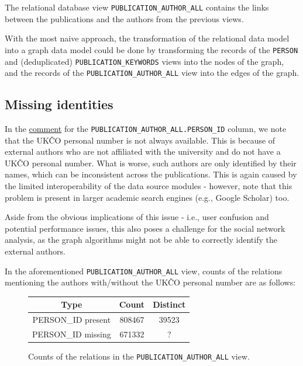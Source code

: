 The relational database view \texttt{PUBLICATION\_AUTHOR\_ALL} contains the links between the publications and the authors from the previous views.

With the most naive approach, the transformation of the relational data model into a graph data model could be done by transforming the records of the 
\texttt{PERSON} and (deduplicated) \texttt{PUBLICATION\_KEYWORDS} views into the nodes of the graph, 
and the records of the \texttt{PUBLICATION\_AUTHOR\_ALL} view into the edges of the graph.

\subsection{Missing identities}\label{sec:inferring-missing-identities}

    In the \hyperref[sec:pub-author-all]{comment} for the \texttt{PUBLICATION\_AUTHOR\_ALL.PERSON\_ID} column, we note that the \ac{UKČO} personal number is not always available.
    This is because of external authors who are not affiliated with the university and do not have a \ac{UKČO} personal number.
What is worse, such authors are only identified by their names, which can be inconsistent across the publications.
This is again caused by the limited interoperability of the data source modules - however, note 
that this problem is present in larger academic search engines (e.g., Google Scholar) too.

Aside from the obvious implications of this issue - i.e., user confusion and potential performance issues,
this also poses a challenge for the social network analysis, as the graph algorithms might not be able 
to correctly identify the external authors.

    In the aforementioned \texttt{PUBLICATION\_AUTHOR\_ALL} view, counts of the relations mentioning the authors with/without the \ac{UKČO} personal number are as follows:

\begin{figure}[!ht]
    \captionsetup{width=.9\linewidth}
    \centering
    \begin{tabular}{|c|c|c|}
    \hline
        Type & Count & Distinct \\ \hline
        PERSON\_ID present & 808467 & 39523 \\ \hline
        PERSON\_ID missing & 671332 & ? \\ \hline
    \end{tabular}
    \caption{Counts of the relations in the \texttt{PUBLICATION\_AUTHOR\_ALL} view.}
\end{figure}

